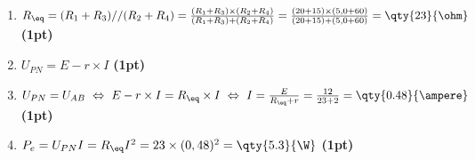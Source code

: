 \begin{enumerate}
    \item $R_{\eq}=(R_1+R_3)//(R_2+R_4)=
          \frac{(R_1+R_3)\times(R_2+R_4)}{(R_1+R_3)+(R_2+R_4)}=
          \frac{(20+15)\times(5,0+60)}{(20+15)+(5,0+60)}=\qty{23}{\ohm}$
          \hfill\textbf{(1pt)}

    \item $U_{PN}=E-r\times I$
          \hfill\textbf{(1pt)}

    \item $U_{PN}=U_{AB}
          \ \Leftrightarrow\
          E-r\times I=R_{\eq}\times I
          \ \Leftrightarrow\
          I=\frac{E}{R_{\eq}+r}=
          \frac{12}{23+2}=\qty{0.48}{\ampere}$
          \hfill\textbf{(1pt)}

    \item $P_e=U_{PN}I=R_{\eq}I^2=23\times (0,48)^2=\qty{5.3}{\W}$
          \hfill\textbf{(1pt)}
\end{enumerate}

